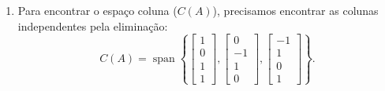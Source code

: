 \begin{resolution}
\begin{enumerate}[label=\alph*)]
    \item Para encontrar o espaço coluna (\( C(A) \)), precisamos encontrar as colunas independentes pela eliminação:
          \[
            C(A) = \operatorname{span}\left\{
            \begin{bmatrix} 1 \\ 0 \\ 1 \\ 1 \end{bmatrix},
            \begin{bmatrix} 0 \\ -1 \\ 1 \\ 0 \end{bmatrix},
            \begin{bmatrix} -1 \\ 1 \\ 0 \\ 1 \end{bmatrix}
            \right\}.
          \]


\end{enumerate}
\end{resolution}
